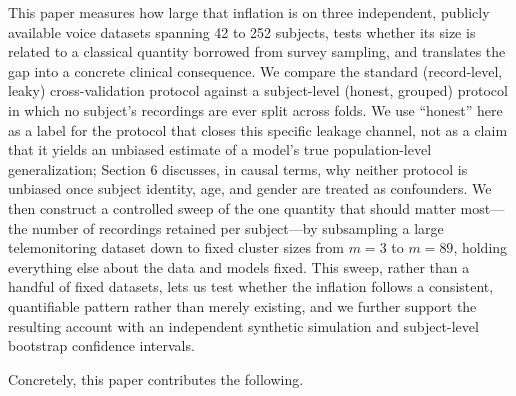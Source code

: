\documentclass[11pt]{article}
\begin{document}
This paper measures how large that inflation is on three independent, publicly available voice datasets spanning 42 to 252 subjects, tests whether its size is related to a classical quantity borrowed from survey sampling, and translates the gap into a concrete clinical consequence. We compare the standard (record-level, leaky) cross-validation protocol against a subject-level (honest, grouped) protocol in which no subject's recordings are ever split across folds. We use ``honest'' here as a label for the protocol that closes this specific leakage channel, not as a claim that it yields an unbiased estimate of a model's true population-level generalization; Section 6 discusses, in causal terms, why neither protocol is unbiased once subject identity, age, and gender are treated as confounders. We then construct a controlled sweep of the one quantity that should matter most---the number of recordings retained per subject---by subsampling a large telemonitoring dataset down to fixed cluster sizes from $m=3$ to $m=89$, holding everything else about the data and models fixed. This sweep, rather than a handful of fixed datasets, lets us test whether the inflation follows a consistent, quantifiable pattern rather than merely existing, and we further support the resulting account with an independent synthetic simulation and subject-level bootstrap confidence intervals.

Concretely, this paper contributes the following.
\end{document}
